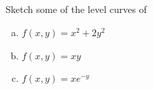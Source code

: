 
\subsection*{\Procedural}

\begin{question}
Sketch some of the level curves of
\begin{enumerate}[(a)]
\item $f(x,y)=x^2+2y^2$
\item $f(x,y)=xy$
\item $f(x,y)=xe^{-y}$
\end{enumerate}

\end{question}

%

